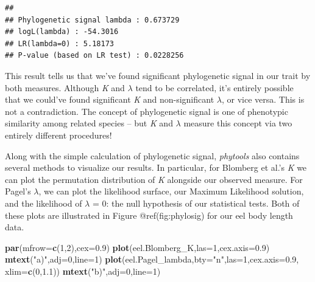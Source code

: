 \documentclass[fleqn,10pt,lineno]{wlpeerj}
\newenvironment{Shaded}{\begin{snugshade}}{\end{snugshade}}
\newcommand{\AttributeTok}[1]{\textcolor[rgb]{0.13,0.29,0.53}{#1}}
\newcommand{\DecValTok}[1]{\textcolor[rgb]{0.00,0.00,0.81}{#1}}
\newcommand{\FloatTok}[1]{\textcolor[rgb]{0.00,0.00,0.81}{#1}}
\newcommand{\FunctionTok}[1]{\textcolor[rgb]{0.13,0.29,0.53}{\textbf{#1}}}
\newcommand{\NormalTok}[1]{#1}
\newcommand{\StringTok}[1]{\textcolor[rgb]{0.31,0.60,0.02}{#1}}
\begin{document}
\begin{verbatim}
## 
## Phylogenetic signal lambda : 0.673729 
## logL(lambda) : -54.3016 
## LR(lambda=0) : 5.18173 
## P-value (based on LR test) : 0.0228256
\end{verbatim}

This result tells us that we've found significant phylogenetic signal in
our trait by both measures. Although \emph{K} and \(\lambda\) tend to be
correlated, it's entirely possible that we could've found significant
\emph{K} and non-significant \(\lambda\), or vice versa. This is not a
contradiction. The concept of phylogenetic signal is one of phenotypic
similarity among related species -- but \emph{K} and \(\lambda\) measure
this concept via two entirely different procedures!

Along with the simple calculation of phylogenetic signal,
\emph{phytools} also contains several methods to visualize our results.
In particular, for Blomberg et al.'s \emph{K} we can plot the
permutation distribution of \emph{K} alongside our observed measure. For
Pagel's \(\lambda\), we can plot the likelihood surface, our Maximum
Likelihood solution, and the likelihood of \(\lambda\) = 0: the null
hypothesis of our statistical tests. Both of these plots are illustrated
in Figure @ref(fig:phylosig) for our eel body length data.

\begin{Shaded}
\begin{Highlighting}[]
\FunctionTok{par}\NormalTok{(}\AttributeTok{mfrow=}\FunctionTok{c}\NormalTok{(}\DecValTok{1}\NormalTok{,}\DecValTok{2}\NormalTok{),}\AttributeTok{cex=}\FloatTok{0.9}\NormalTok{)}
\FunctionTok{plot}\NormalTok{(eel.Blomberg\_K,}\AttributeTok{las=}\DecValTok{1}\NormalTok{,}\AttributeTok{cex.axis=}\FloatTok{0.9}\NormalTok{)}
\FunctionTok{mtext}\NormalTok{(}\StringTok{"a)"}\NormalTok{,}\AttributeTok{adj=}\DecValTok{0}\NormalTok{,}\AttributeTok{line=}\DecValTok{1}\NormalTok{)}
\FunctionTok{plot}\NormalTok{(eel.Pagel\_lambda,}\AttributeTok{bty=}\StringTok{"n"}\NormalTok{,}\AttributeTok{las=}\DecValTok{1}\NormalTok{,}\AttributeTok{cex.axis=}\FloatTok{0.9}\NormalTok{,}
  \AttributeTok{xlim=}\FunctionTok{c}\NormalTok{(}\DecValTok{0}\NormalTok{,}\FloatTok{1.1}\NormalTok{))}
\FunctionTok{mtext}\NormalTok{(}\StringTok{"b)"}\NormalTok{,}\AttributeTok{adj=}\DecValTok{0}\NormalTok{,}\AttributeTok{line=}\DecValTok{1}\NormalTok{)}
\end{Highlighting}
\end{Shaded}
\end{document}
